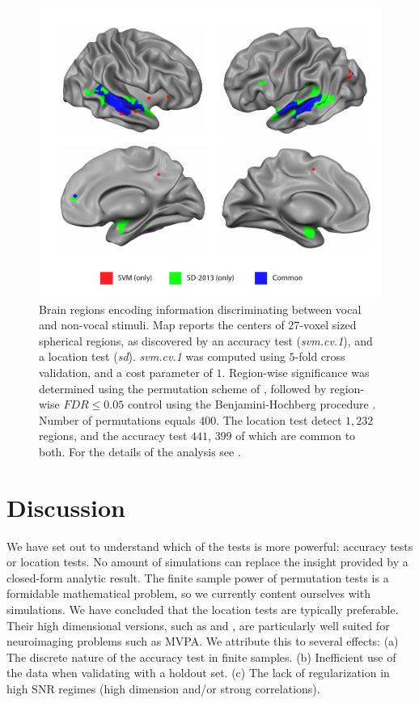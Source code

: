 \documentclass[12pt,a4paper]{article}
\begin{document}
\begin{figure}[th]
\centering
\includegraphics[width=0.7\linewidth]{"art/svm_vs_SD"}
\caption{\footnotesize
Brain regions encoding information discriminating between vocal and non-vocal stimuli.
Map reports the centers of $27$-voxel sized spherical regions, as discovered by an accuracy test (\emph{svm.cv.1}), and a location test (\emph{sd}). 
\emph{svm.cv.1} was computed using $5$-fold cross validation, and a cost parameter of $1$. 
Region-wise significance was determined using the permutation scheme of \cite{stelzer_statistical_2013}, followed by region-wise $FDR \leq 0.05$ control using the Benjamini-Hochberg procedure \citep{benjamini_controlling_1995}.
Number of permutations equals $400$.
The location test detect $1,232$ regions, and the accuracy test $441$, $399$ of which are common to both.
For the details of the analysis see \cite{gilron_quantifying_2016}.  
  }
\label{fig:read_data}
\end{figure}








\section{Discussion}
\label{sec:discussion}

We have set out to understand which of the tests is more powerful: accuracy tests or location tests. 
No amount of simulations can replace the insight provided by a closed-form analytic result. 
The finite sample power of permutation tests is a formidable mathematical problem, so we currently content ourselves with simulations.
We have concluded that the location tests are typically preferable. 
Their high dimensional versions, such as \cite{srivastava_multivariate_2007} and \cite{schafer_shrinkage_2005},  are particularly well suited for neuroimaging problems such as MVPA.
We attribute this to several effects: \newline
(a) The discrete nature of the accuracy test in finite samples. \newline
(b) Inefficient use of the data when validating with a holdout set. \newline
(c) The lack of regularization in high SNR regimes (high dimension and\slash or strong correlations). \newline
\end{document}
